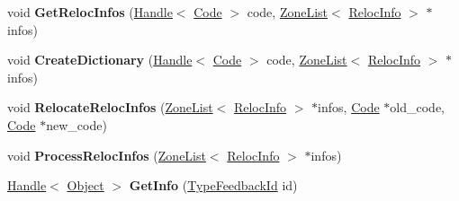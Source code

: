 \begin{DoxyCompactItemize}
\item 
void {\bfseries Get\+Reloc\+Infos} (\hyperlink{classv8_1_1internal_1_1_handle}{Handle}$<$ \hyperlink{classv8_1_1internal_1_1_code}{Code} $>$ code, \hyperlink{classv8_1_1internal_1_1_zone_list}{Zone\+List}$<$ \hyperlink{classv8_1_1internal_1_1_reloc_info}{Reloc\+Info} $>$ $\ast$infos)\hypertarget{classv8_1_1internal_1_1_type_feedback_oracle_a8e548dee4a23bdfdddceec01c9686562}{}\label{classv8_1_1internal_1_1_type_feedback_oracle_a8e548dee4a23bdfdddceec01c9686562}

\item 
void {\bfseries Create\+Dictionary} (\hyperlink{classv8_1_1internal_1_1_handle}{Handle}$<$ \hyperlink{classv8_1_1internal_1_1_code}{Code} $>$ code, \hyperlink{classv8_1_1internal_1_1_zone_list}{Zone\+List}$<$ \hyperlink{classv8_1_1internal_1_1_reloc_info}{Reloc\+Info} $>$ $\ast$infos)\hypertarget{classv8_1_1internal_1_1_type_feedback_oracle_a617872aa1dab70229e435f76318e9b26}{}\label{classv8_1_1internal_1_1_type_feedback_oracle_a617872aa1dab70229e435f76318e9b26}

\item 
void {\bfseries Relocate\+Reloc\+Infos} (\hyperlink{classv8_1_1internal_1_1_zone_list}{Zone\+List}$<$ \hyperlink{classv8_1_1internal_1_1_reloc_info}{Reloc\+Info} $>$ $\ast$infos, \hyperlink{classv8_1_1internal_1_1_code}{Code} $\ast$old\+\_\+code, \hyperlink{classv8_1_1internal_1_1_code}{Code} $\ast$new\+\_\+code)\hypertarget{classv8_1_1internal_1_1_type_feedback_oracle_a7aae515407ce641835873d97ebd7408c}{}\label{classv8_1_1internal_1_1_type_feedback_oracle_a7aae515407ce641835873d97ebd7408c}

\item 
void {\bfseries Process\+Reloc\+Infos} (\hyperlink{classv8_1_1internal_1_1_zone_list}{Zone\+List}$<$ \hyperlink{classv8_1_1internal_1_1_reloc_info}{Reloc\+Info} $>$ $\ast$infos)\hypertarget{classv8_1_1internal_1_1_type_feedback_oracle_a275a4ab2d5aa7b149e69c72e1deba1d0}{}\label{classv8_1_1internal_1_1_type_feedback_oracle_a275a4ab2d5aa7b149e69c72e1deba1d0}

\item 
\hyperlink{classv8_1_1internal_1_1_handle}{Handle}$<$ \hyperlink{classv8_1_1internal_1_1_object}{Object} $>$ {\bfseries Get\+Info} (\hyperlink{classv8_1_1internal_1_1_type_feedback_id}{Type\+Feedback\+Id} id)\hypertarget{classv8_1_1internal_1_1_type_feedback_oracle_a3653c7af23de0f30e8ec4fbd9a9ff4af}{}\label{classv8_1_1internal_1_1_type_feedback_oracle_a3653c7af23de0f30e8ec4fbd9a9ff4af}


\end{DoxyCompactItemize}
